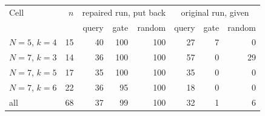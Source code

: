 \begin{tabular}{lrrrrrrr}
\toprule
Cell & $n$ & \multicolumn{3}{c}{repaired run, put back} & \multicolumn{3}{c}{original run, given} \\
 & & query & gate & random & query & gate & random \\
\midrule
$N=5$, $k=4$ & 15 & 40 & 100 & 100 & 27 & 7 & 0 \\
$N=7$, $k=3$ & 14 & 36 & 100 & 100 & 57 & 0 & 29 \\
$N=7$, $k=5$ & 17 & 35 & 100 & 100 & 35 & 0 & 0 \\
$N=7$, $k=6$ & 22 & 36 & 95 & 100 & 18 & 0 & 0 \\
\midrule
all & 68 & 37 & 99 & 100 & 32 & 1 & 6 \\
\bottomrule
\end{tabular}
